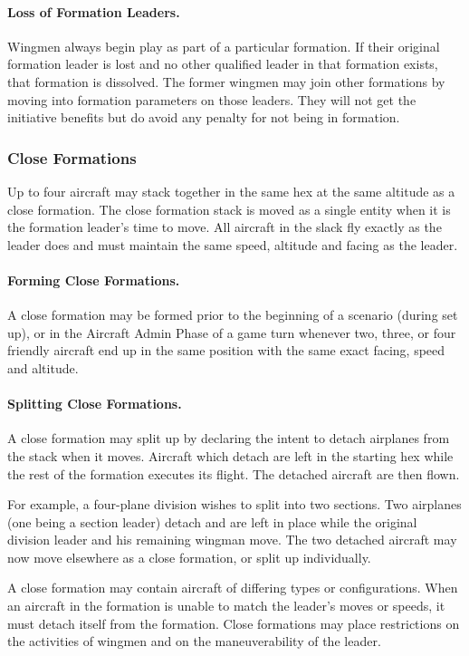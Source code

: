 \paragraph{Loss of Formation Leaders.} Wingmen always begin play as part of a particular formation. If their original formation leader is lost and no other qualified leader in that formation exists, that formation is dissolved. The former wingmen may join other formations by moving into formation parameters on those leaders. They will not get the initiative benefits but do avoid any penalty for not being in formation.

\subsubsection{Close Formations}

Up to four aircraft may stack together in the same hex at the same altitude as a close formation. The close formation stack is moved as a single entity when it is the formation leader's time to move. All aircraft in the slack fly exactly as the leader does and must maintain the same speed, altitude and facing as the leader.

\paragraph{Forming Close Formations.} A close formation may be formed prior to the beginning of a scenario (during set up), or in the Aircraft Admin Phase of a game turn whenever two, three, or four friendly aircraft end up in the same position with the same exact facing, speed and altitude.

\paragraph{Splitting Close Formations.} A close formation may split up by declaring the intent to detach airplanes from the stack when it moves. Aircraft which detach are left in the starting hex while the rest of the formation executes its flight. The detached aircraft are then flown.

For example, a four-plane division wishes to split into two sections. Two airplanes (one being a section leader) detach and are left in place while the original division leader and his remaining wingman move. The two detached aircraft may now move elsewhere as a close formation, or split up individually.

A close formation may contain aircraft of differing types or configurations. When an aircraft in the formation is unable to match the leader's moves or speeds, it must detach itself from the formation. Close formations may place restrictions on the activities of wingmen and on the maneuverability of the leader.

